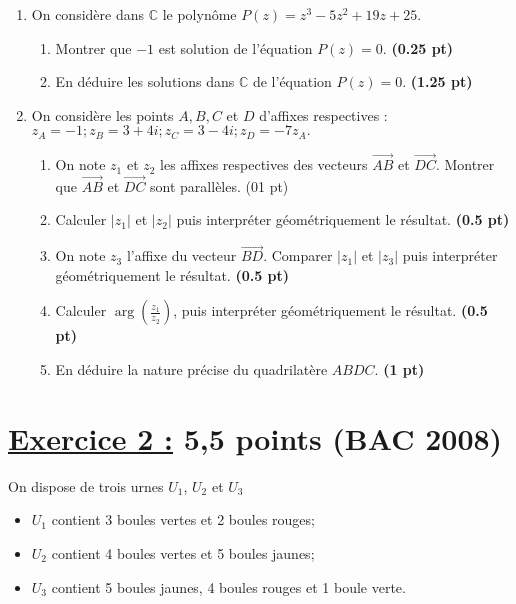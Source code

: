 \documentclass[12pt,a4paper]{article}
\begin{document}
\begin{enumerate}
    \item On considère dans \( \mathbb{C} \) le polynôme \( P(z) = z^3 - 5z^2 + 19z + 25 \).
    \begin{enumerate}
        \item Montrer que \( -1 \) est solution de l’équation \( P(z) = 0 \). \hfill \textbf{(0.25 pt)}
        \item En déduire les solutions dans \( \mathbb{C} \) de l’équation \( P(z) = 0 \). \hfill \textbf{(1.25 pt)}
    \end{enumerate}
    \item On considère les points \( A, B, C \) et \( D \) d’affixes respectives :
    \(
    z_A = -1 ; z_B = 3 + 4i ; z_C = 3 - 4i ; z_D = -7z_A.
    \)
    \begin{enumerate}
        \item On note \( z_1 \) et \( z_2 \) les affixes respectives des vecteurs \( \overrightarrow{AB} \) et \( \overrightarrow{DC} \). Montrer que \( \overrightarrow{AB} \) et \( \overrightarrow{DC} \) sont parallèles. \hfill (01 pt)
        \item Calculer \( |z_1| \) et \( |z_2| \) puis interpréter géométriquement le résultat. \hfill \textbf{(0.5 pt)}
        \item On note \( z_3 \) l’affixe du vecteur \( \overrightarrow{BD} \). Comparer \( |z_1| \) et \( |z_3| \) puis interpréter géométriquement le résultat. \hfill \textbf{(0.5 pt)}
        \item Calculer \( \arg \left(\frac{z_{1}}{z_{2}}\right) \), puis interpréter géométriquement le résultat. \hfill \textbf{(0.5 pt)}
        \item En déduire la nature précise du quadrilatère \( ABDC \). \hfill \textbf{(1 pt)}
    \end{enumerate}
\end{enumerate}
\section*{\underline{Exercice 2 :} 5,5 points (BAC 2008)}

On dispose de trois urnes $U_1$, $U_2$ et $U_3$ 

\begin{itemize}
    \item $U_1$ contient 3 boules vertes et 2 boules rouges;
    \item $U_2$ contient 4 boules vertes et 5 boules jaunes;
    \item $U_3$ contient 5 boules jaunes, 4 boules rouges et 1 boule verte.
\end{itemize}
\end{document}

